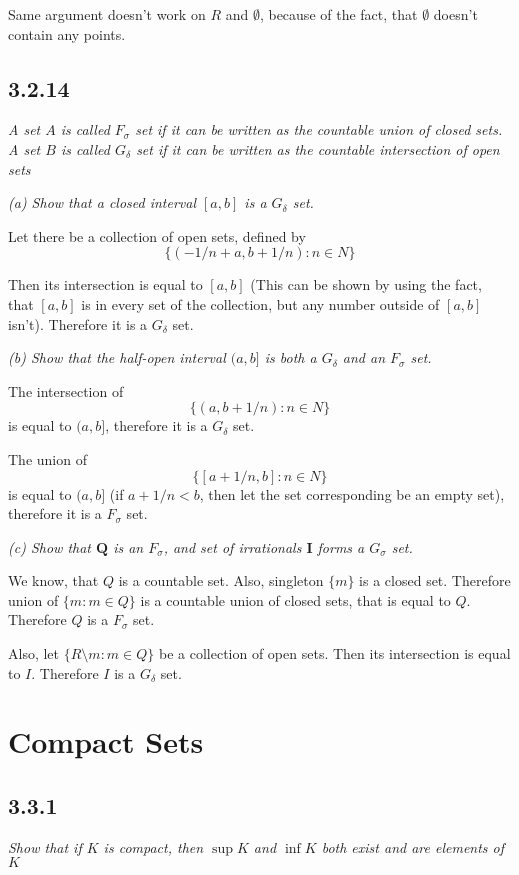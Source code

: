 \documentclass[11pt,oneside,titlepage]{book}
\begin{document}
Same argument doesn't work on $R$ and $\emptyset$, because of the fact,
that $\emptyset$ doesn't contain any points.

\subsection*{3.2.14}
\textit{A set $A$ is called $F_\sigma$ set if it can be written as the
  countable union of closed sets. A set $B$ is called $G_\delta$ set if it
  can be written as the countable intersection of open sets}

\textit{(a) Show that a closed interval $[a,b]$ is a $G_\delta$ set.}

Let there be a collection of open sets, defined by
$$\{(-1/n + a, b + 1/n): n \in N\}$$

Then its intersection is equal to $[a,b]$ (This can be shown by using the fact, that
$[a,b]$ is in every set of the  collection, but any number outside of $[a,b]$
isn't). Therefore it is a $G_\delta$ set.

\textit{(b) Show that the half-open interval $(a,b]$ is both a $G_\delta$ and
  an $F_\sigma$ set.}

The intersection of
$$\{(a, b + 1/n): n \in N\}$$
is equal to $(a, b]$, therefore it is a $G_\delta$ set.

The union of
$$\{[a + 1/n, b]: n \in N\}$$
is equal to $(a, b]$ (if  $a + 1/n < b$, then let the set corresponding be an
empty set), therefore it is a $F_\sigma$ set.

\textit{(c) Show that $\textbf{Q}$ is an $F_\sigma$, and set of irrationals
  $\textbf{I}$ forms a $G_\sigma$ set.}

We know, that $Q$ is a countable set. Also, singleton $\{m\}$ is a closed set.
Therefore union of 
$\{m: m \in Q\}$
is a countable union of closed sets, that is equal to $Q$. Therefore $Q$ is a
$F_\sigma$ set.

Also, let
$\{R \setminus m: m \in Q\}$
be a collection of open sets. Then its intersection is equal to $I$.
Therefore $I$ is a $G_\delta$ set.

\section{Compact Sets}

\subsection*{3.3.1}
\textit{Show that if $K$ is compact, then $\sup K$ and $\inf K$ both exist
  and are elements of $K$}
\end{document}
